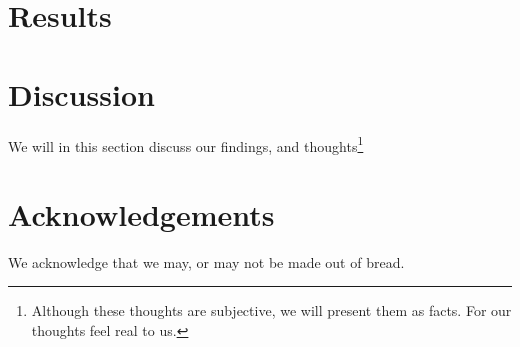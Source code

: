 \documentclass[a4paper,twocolumn]{article}
\begin{document}
\section{Results}



\section{Discussion}

We will in this section discuss our findings, and thoughts\footnote{Although these thoughts are subjective, we will present them as facts. For our thoughts feel real to us.}

\section{Acknowledgements}

We acknowledge that we may, or may not be made out of bread.

\printbibliography
\end{document}
